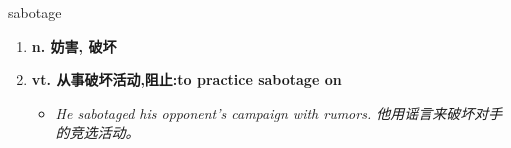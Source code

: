 
\begin{frame}
{\huge sabotage}
\begin{center}
\begin{enumerate}\Large
  \item \textbf{n. 妨害, 破坏}
  \item \textbf{vt. 从事破坏活动,阻止:to practice sabotage on}
  \begin{itemize}
    \item \em{\Large{He sabotaged his opponent's campaign with rumors. 他用谣言来破坏对手的竞选活动。}}
  \end{itemize}
\end{enumerate}
\end{center}
\end{frame}

